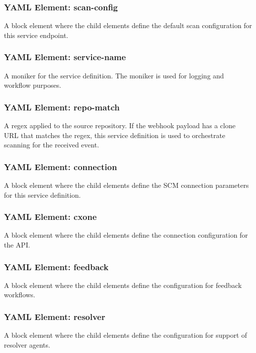 \subsubsection{YAML Element: scan-config}\label{sec:yaml-moniker-scan-config}
A block element where the child elements define the default scan configuration for this service endpoint.

\subsubsection{YAML Element: service-name}\label{sec:yaml-moniker-service-name}
A moniker for the service definition. The moniker is used for logging and workflow purposes.

\subsubsection{YAML Element: repo-match}\label{sec:yaml-moniker-repo-match}
A regex applied to the source repository.  If the webhook payload has
a clone URL that matches the regex, this service definition is used to orchestrate scanning
for the received event.

\subsubsection{YAML Element: connection}\label{sec:yaml-moniker-connection}
A block element where the child elements define the SCM connection parameters for this service definition.

\subsubsection{YAML Element: cxone}\label{sec:yaml-moniker-cxone}
A block element where the child elements define the connection configuration for the \cxone API. 

\subsubsection{YAML Element: feedback}\label{sec:yaml-moniker-feedback}
A block element where the child elements define the configuration for feedback workflows. 

\subsubsection{YAML Element: resolver}\label{sec:yaml-moniker-resolver}
A block element where the child elements define the configuration for support of resolver agents. 

